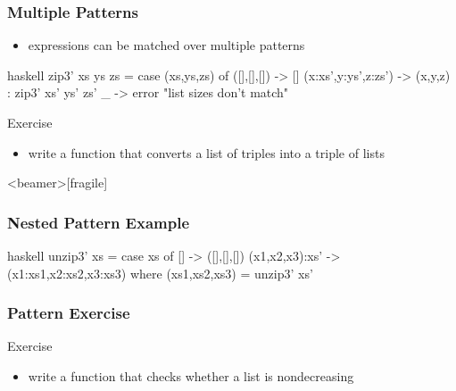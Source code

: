 \documentclass[dvipsnames]{beamer}
\theoremstyle{plain}
\begin{document}
\begin{frame}[fragile]
  \frametitle{Multiple Patterns}

  \begin{itemize}
    \item expressions can be matched over multiple patterns
  \end{itemize}

  \begin{example}
    \pause
    \begin{pygments}{haskell}
zip3' xs ys zs =
    case (xs,ys,zs) of
      ([],[],[]) -> []
      (x:xs',y:ys',z:zs') -> (x,y,z) : zip3' xs' ys' zs'
      _ -> error "list sizes don't match"
    \end{pygments}
  \end{example}

  \pause
  \begin{block}{Exercise}
    \begin{itemize}
      \item write a function that converts a list of triples into a triple of
        lists
    \end{itemize}
  \end{block}
\end{frame}

\begin{frame}<beamer>[fragile]
  \frametitle{Nested Pattern Example}

  \begin{example}
    \begin{pygments}{haskell}
unzip3' xs =
    case xs of
      [] -> ([],[],[])
      (x1,x2,x3):xs' -> (x1:xs1,x2:xs2,x3:xs3)
                        where (xs1,xs2,xs3) = unzip3' xs'
    \end{pygments}
  \end{example}
\end{frame}

\begin{frame}
  \frametitle{Pattern Exercise}

  \begin{block}{Exercise}
    \begin{itemize}
      \item write a function that checks whether a list is nondecreasing
    \end{itemize}
  \end{block}
\end{frame}
\end{document}
